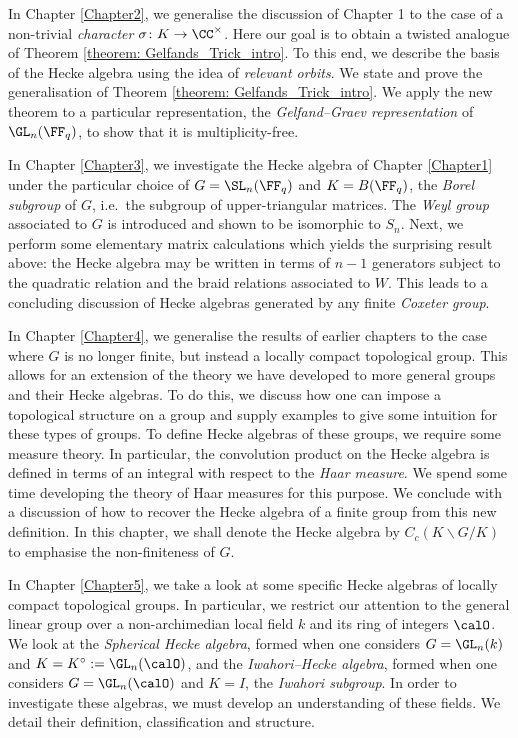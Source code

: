 \documentclass[11pt]{amsart}
\theoremstyle{remark}
\begin{document}
In Chapter \ref{Chapter2}, we generalise the discussion of Chapter 1 to the case of a non-trivial \emph{character} $\sigma\colon K\to\CC^\times$.
Here our goal is to obtain a twisted analogue of Theorem \ref{theorem: Gelfands_Trick_intro}.
To this end, we describe the basis of the Hecke algebra using the idea of \emph{relevant orbits}.
We state and prove the generalisation of Theorem \ref{theorem: Gelfands_Trick_intro}.
We apply the new theorem to a particular representation, the \emph{Gelfand--Graev representation} of $\GL_n(\FF_q)$, to show that it is multiplicity-free.

In Chapter \ref{Chapter3}, we investigate the Hecke algebra of Chapter \ref{Chapter1} under the particular choice of $G=\SL_n(\FF_q)$ and $K=B(\FF_q)$, the \emph{Borel subgroup} of $G$, i.e.\ the subgroup of upper-triangular matrices.
The \emph{Weyl group} associated to $G$ is introduced and shown to be isomorphic to $S_n$.
Next, we perform some elementary matrix calculations which yields the surprising result above: the Hecke algebra may be written in terms of $n-1$ generators subject to the quadratic relation and the braid relations associated to $W$.
This leads to a concluding discussion of Hecke algebras generated by any finite \emph{Coxeter group}.

In Chapter \ref{Chapter4}, we generalise the results of earlier chapters to the case where $G$ is no longer finite, but instead a locally compact topological group.
This allows for an extension of the theory we have developed to more general groups and their Hecke algebras.
To do this, we discuss how one can impose a topological structure on a group and supply examples to give some intuition for these types of groups.
To define Hecke algebras of these groups, we require some measure theory.
In particular, the convolution product on the Hecke algebra is defined in terms of an integral with respect to the \emph{Haar measure}.
We spend some time developing the theory of Haar measures for this purpose.
We conclude with a discussion of how to recover the Hecke algebra of a finite group from this new definition.
In this chapter, we shall denote the Hecke algebra by $C_c(K\backslash G/K)$ to emphasise the non-finiteness of $G$.

In Chapter \ref{Chapter5}, we take a look at some specific Hecke algebras of locally compact topological groups.
In particular, we restrict our attention to the general linear group over a non-archimedian local field $k$ and its ring of integers $\calO$.
We look at the \emph{Spherical Hecke algebra}, formed when one considers $G=\GL_n(k)$ and $K=K^\circ := \GL_n(\calO)$, and the \emph{Iwahori--Hecke algebra}, formed when one considers $G=\GL_n(\calO)$ and $K=I$, the \emph{Iwahori subgroup}.
In order to investigate these algebras, we must develop an understanding of these fields.
We detail their definition, classification and structure.
\end{document}
